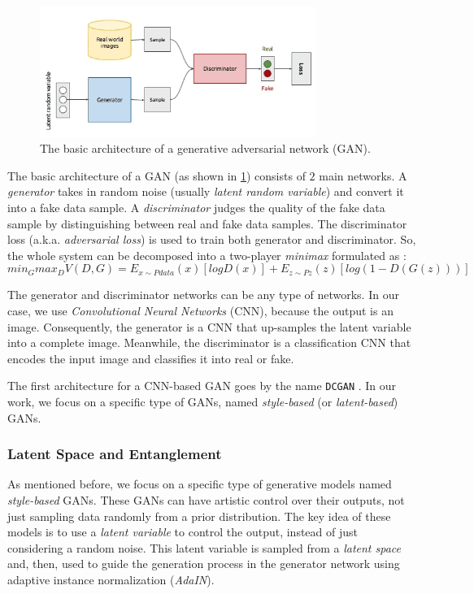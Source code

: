\begin{figure}[H]
    \centering
    \includegraphics[width=0.8\textwidth]{images/gan-arch.png}
    \caption{The basic architecture of a generative adversarial network (GAN).}
    \label{fig:gan}
\end{figure}

The basic architecture of a GAN (as shown in \ref{fig:gan}) consists of $2$ main networks. A \emph{generator} takes in random noise (usually \emph{latent random variable}) and convert it into a fake data sample. A \emph{discriminator} judges the quality of the fake data sample by distinguishing between real and fake data samples. The discriminator loss (a.k.a. \emph{adversarial loss}) is used to train both generator and discriminator. So, the whole system can be decomposed into a two-player \emph{minimax} formulated as :
\begin{equation}
    min_{G} max_{D} V(D, G) = E_{x \sim Pdata}(x) [log D(x)] + E_{z \sim Pz}(z)[log(1 - D(G(z)))]
\end{equation}

The generator and discriminator networks can be any type of networks. In our case, we use \emph{Convolutional Neural Networks} (CNN), because the output is an image. Consequently, the generator is a CNN that up-samples the latent variable into a complete image. Meanwhile, the discriminator is a classification CNN that encodes the input image and classifies it into real or fake.

The first architecture for a CNN-based GAN goes by the name \texttt{DCGAN} \cite{radford2016unsupervised}. In our work, we focus on a specific type of GANs, named \emph{style-based} (or \emph{latent-based}) GANs.

\subsubsection{Latent Space and Entanglement}
As mentioned before, we focus on a specific type of generative models named \emph{style-based} GANs. These GANs can have artistic control over their outputs, not just sampling data randomly from a prior distribution. The key idea of these models is to use a \emph{latent variable} to control the output, instead of just considering a random noise. This latent variable is sampled from a \emph{latent space} and, then, used to guide the generation process in the generator network using adaptive instance normalization (\emph{AdaIN}).

